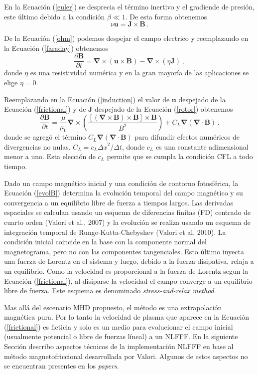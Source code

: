 \documentclass[a4paper,10pt]{article}
\def\bB{{\boldsymbol{B}}}
\def\bJ{{\boldsymbol{J}}}
\def\bu{{\boldsymbol{u}}}
\def\rot{\boldsymbol{\nabla \times}}
\def\grad{\boldsymbol{\nabla}}
\def\div{\boldsymbol{\nabla \cdot}}
\def\dt#1{\frac{\partial #1}{\partial t}}
\def\eq#1{Ecuación (\ref{#1})}
\begin{document}
En la \eq{euler} se desprecia el término inertivo y el gradiende de presión, este último debido a la condición $\beta \ll 1$. De esta forma obtenemos
\begin{equation}
 \nu {\bu}= {\bJ} \times {\bB} \,.
\label{frictional}
\end{equation}

De la \eq{ohm} podemos despejar el campo electrico y reemplazando en la \eq{faraday} obtenemos
\begin{equation}
\dt{\bB} = \rot (\bu \times \bB) -\rot(\eta \bJ) \,,
\label{induction}
\end{equation}
donde $\eta$ es una resistividad numérica y en la gran mayoría de las aplicaciones se elige $\eta=0$. 

Reemplazando en la \eq{induction} el valor de $\bu$ despejado de la \eq{frictional} y de $\bJ$ despejado de la \eq{rotor} obtenemos 
\begin{equation}
 \dt{\bB} = \frac{\mu}{\mu_0} \rot \left(\frac{[({ \rot \bB}) \times {\bB}] \times \bB}{B^2}\right) + C_L \grad (\div \bB) \,.
 \label{evolB}
\end{equation}
donde se agregó el término $ C_L \grad (\div \bB)$ para difundir efectos numéricos de  divergencias no nulas. $C_L=c_L {\Delta x}^2/\Delta t$, donde $c_L$ es una constante adimensional menor a uno. Esta elección de $c_L$ permite que se cumpla la condición CFL a todo tiempo.  

Dado un campo magnético inicial y una condición de contorno fotosférica, la \eq{evolB} determina la evolución temporal del campo magnético y su convergencia a un equilibrio libre de fuerza a tiempos largos. 
%
Las derivadas espaciales se calculan usando un esquema de diferencias finitas (FD) centrado de cuarto orden (Valori et al., 2007) y la evolución se realiza usando un esquema de integración temporal de Runge-Kutta-Chebyshev (Valori et al. 2010).
%
La condición inicial coincide en la base con la componente normal del magnetograma, pero no con las componentes tangenciales. Esto último inyecta una fuerza de Lorentz en el sistema y luego, debido a la fuerza disipativa, relaja a un equilibrio. Como la velocidad es proporcional a la fuerza de Lorentz segun la \eq{frictional}, al disiparse la velocidad el campo converge a un equilibrio libre de fuerza. Este esquema es denominado \emph{stress-and-relax method}.

Mas allá del escenario MHD propuesto, el método es una extrapolación magnética pura. Por lo tanto la velocidad de plasma que aparece en la \eq{frictional} es ficticia y solo es un medio para evolucionar el campo inicial (usualmente potencial o libre de fuerzas líneal) a un NLFFF. En la siguiente Sección describo aspectos técnicos de la implementación NLFFF en base al método magnetofriccional desarrollada por Valori. Algunos de estos aspectos no se encuentran presentes en los \emph{papers}.
\end{document}
